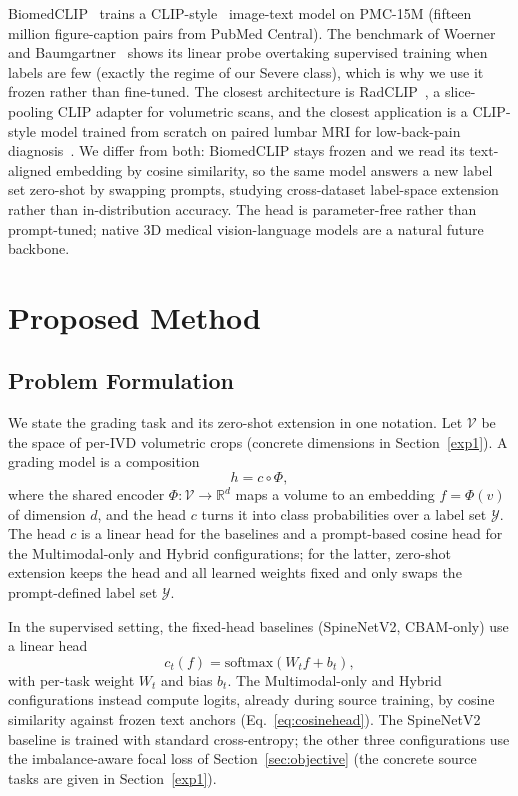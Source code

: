 \documentclass[runningheads]{llncs}
\begin{document}
BiomedCLIP~\cite{zhang2023biomedclip} trains a CLIP-style~\cite{radford2021clip} image-text model on PMC-15M (fifteen million figure-caption pairs from PubMed Central). The benchmark of Woerner and Baumgartner~\cite{datascarcity2024} shows its linear probe overtaking supervised training when labels are few (exactly the regime of our Severe class), which is why we use it frozen rather than fine-tuned. The closest architecture is RadCLIP~\cite{lu2024radclip}, a slice-pooling CLIP adapter for volumetric scans, and the closest application is a CLIP-style model trained from scratch on paired lumbar MRI for low-back-pain diagnosis~\cite{le2025lumbarclip}. We differ from both: BiomedCLIP stays frozen and we read its text-aligned embedding by cosine similarity, so the same model answers a new label set zero-shot by swapping prompts, studying cross-dataset label-space extension rather than in-distribution accuracy. The head is parameter-free rather than prompt-tuned; native 3D medical vision-language models are a natural future backbone.

\section{Proposed Method}\label{sec3}

\subsection{Problem Formulation}\label{sec:formulation}

We state the grading task and its zero-shot extension in one notation. Let $\mathcal{V}$ be the space of per-IVD volumetric crops (concrete dimensions in Section~\ref{exp1}). A grading model is a composition
\begin{equation}
h = c \circ \Phi,
\label{eq:composition}
\end{equation}
where the shared encoder $\Phi:\mathcal{V}\to\mathbb{R}^{d}$ maps a volume to an embedding $f=\Phi(v)$ of dimension $d$, and the head $c$ turns it into class probabilities over a label set $\mathcal{Y}$. The head $c$ is a linear head for the baselines and a prompt-based cosine head for the Multimodal-only and Hybrid configurations; for the latter, zero-shot extension keeps the head and all learned weights fixed and only swaps the prompt-defined label set $\mathcal{Y}$.

In the supervised setting, the fixed-head baselines (SpineNetV2, CBAM-only) use a linear head
\begin{equation}
c_t(f) = \mathrm{softmax}(W_t f + b_t),
\label{eq:linhead}
\end{equation}
with per-task weight $W_t$ and bias $b_t$. The Multimodal-only and Hybrid configurations instead compute logits, already during source training, by cosine similarity against frozen text anchors (Eq.~\ref{eq:cosinehead}). The SpineNetV2 baseline is trained with standard cross-entropy; the other three configurations use the imbalance-aware focal loss of Section~\ref{sec:objective} (the concrete source tasks are given in Section~\ref{exp1}).
\end{document}
